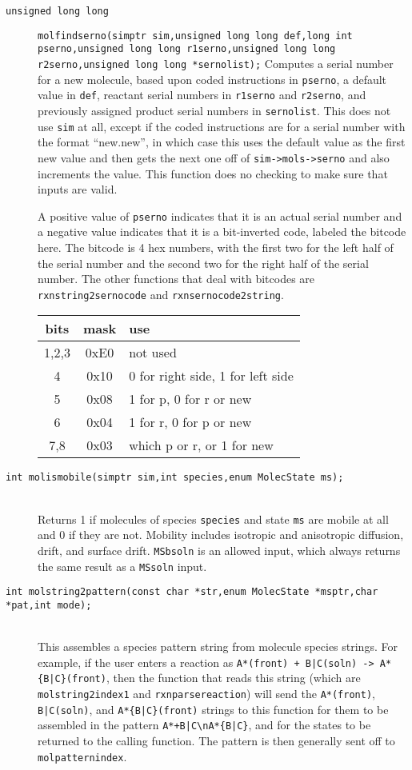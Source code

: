 \documentclass {book}
\newcommand {\ttt} {\texttt}
\begin{document}
\begin{description}
\item[\ttt{unsigned long long}]
\ttt{molfindserno(simptr sim,unsigned long long def,long int pserno,unsigned long long r1serno,unsigned long long r2serno,unsigned long long *sernolist);}
\hfill
Computes a serial number for a new molecule, based upon coded instructions in \ttt{pserno}, a default value in \ttt{def}, reactant serial numbers in \ttt{r1serno} and \ttt{r2serno}, and previously assigned product serial numbers in \ttt{sernolist}. This does not use \ttt{sim} at all, except if the coded instructions are for a serial number with the format ``new.new'', in which case this uses the default value as the first new value and then gets the next one off of \ttt{sim->mols->serno} and also increments the value. This function does no checking to make sure that inputs are valid.

A positive value of \ttt{pserno} indicates that it is an actual serial number and a negative value indicates that it is a bit-inverted code, labeled the bitcode here. The bitcode is 4 hex numbers, with the first two for the left half of the serial number and the second two for the right half of the serial number. The other functions that deal with bitcodes are \ttt{rxnstring2sernocode} and \ttt{rxnsernocode2string}.

\begin{longtable}[c]{ccl}
bits & mask & use\\
\hline
1,2,3 & 0xE0 & not used\\
4 & 0x10 & 0 for right side, 1 for left side\\
5 & 0x08 & 1 for p, 0 for r or new\\
6 & 0x04 & 1 for r, 0 for p or new\\
7,8 & 0x03 & which p or r, or 1 for new
\end{longtable}

\item[\ttt{int molismobile(simptr sim,int species,enum MolecState ms);}]
\hfill \\
Returns 1 if molecules of species \ttt{species} and state \ttt{ms} are mobile at all and 0 if they are not. Mobility includes isotropic and anisotropic diffusion, drift, and surface drift. \ttt{MSbsoln} is an allowed input, which always returns the same result as a \ttt{MSsoln} input.

\item[\ttt{int molstring2pattern(const char *str,enum MolecState *msptr,char *pat,int mode);}]
\hfill \\
This assembles a species pattern string from molecule species strings. For example, if the user enters a reaction as \ttt{A*(front) + B|C(soln) -> A*\{B|C\}(front)}, then the function that reads this string (which are \ttt{molstring2index1} and \ttt{rxnparsereaction}) will send the \ttt{A*(front)}, \ttt{B|C(soln)}, and \ttt{A*\{B|C\}(front)} strings to this function for them to be assembled in the pattern \ttt{A*+B|C\textbackslash nA*\{B|C\}}, and for the states to be returned to the calling function. The pattern is then generally sent off to \ttt{molpatternindex}.


\end{description}
\end{document}
